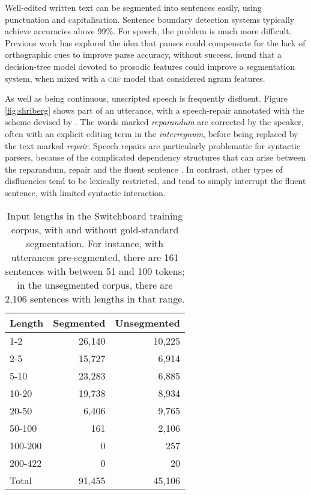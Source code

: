 \documentclass[11pt,letterpaper]{article}
\begin{document}
Well-edited written text can be segmented into sentences easily, using punctuation and
capitalisation.  Sentence boundary detection systems typically achieve accuracies
above 99\%.  For speech, the problem is much more difficult.  Previous work has
explored the idea that pauses could compensate
for the lack of orthographic cues \citep{gregory:04} to improve parse accuracy,
without success.  \citet{liu:05} found that a decision-tree model devoted to prosodic
features could improve a segmentation system, when mixed with a \textsc{crf} model that
considered ngram features.

As well as being continuous, unscripted speech is frequently disfluent.
Figure \ref{fig:shriberg} shows part of an utterance, with a speech-repair annotated
with the scheme devised by \citet{shriberg:94}.  The words marked \emph{reparandum}
are corrected by the speaker, often with an explicit editing term in the
\emph{interregnum}, before being replaced by the text marked \emph{repair}.
Speech repairs are particularly problematic for syntactic
parsers, because of the complicated dependency structures that can arise between the
reparandum, repair and the fluent sentence \citep{Johnson04a}.
In contrast, other types of disfluencies tend to be lexically restricted, and
tend to simply interrupt the fluent sentence, with limited syntactic interaction.

\begin{table}
\centering
\small
\begin{tabular}{l|rr}
    \hline
    Length & Segmented & Unsegmented \\
    \hline \hline
    1-2 & 26,140 & 10,225 \\
    2-5 & 15,727 & 6,914 \\
    5-10 & 23,283 & 6,885 \\
    10-20 & 19,738 &  8,934 \\
    20-50 & 6,406 & 9,765 \\
    50-100 & 161 & 2,106 \\
    100-200 & 0 & 257 \\
    200-422 & 0 & 20 \\
    \hline
    Total & 91,455 & 45,106 \\
    \hline
\end{tabular}
\caption{\small Input lengths in the Switchboard training corpus, with and without
    gold-standard segmentation.  For instance, with utterances pre-segmented,
    there are 161 sentences with between 51 and 100 tokens; in the unsegmented
corpus, there are 2,106 sentences with lengths in that range.
\label{tab:seg_freqs}}
\vspace*{-3em}
\end{table}
\end{document}

